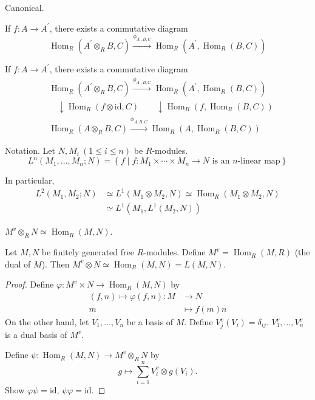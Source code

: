 \documentclass[11pt, a4paper]{report}
\begin{document}
\begin{remark}
Canonical.

If $f: A \rightarrow A^{\prime}$, there exists a commutative diagram
\[
\operatorname{Hom}_{R}\left(A^{\prime} \otimes_{R} B, C\right) \xrightarrow{\phi_{A^{\prime}, B, C}} \operatorname{Hom}_{R}\left(A^{\prime}, \operatorname{Hom}_{R}(B, C)\right)
\]

If $f: A \rightarrow A^{\prime}$, there exists a commutative diagram
\[
\begin{aligned}
& \operatorname{Hom}_{R}\left(A^{\prime} \otimes_{R} B, C\right) \xrightarrow{\phi_{A^{\prime}, B, C}} \operatorname{Hom}_{R}\left(A^{\prime}, \operatorname{Hom}_{R}(B, C)\right) \\
& \quad \downarrow{\operatorname{Hom}_{R}(f \otimes \mathrm{id}, C)} \quad \quad \downarrow{\operatorname{Hom}_{R}(f, \operatorname{Hom}_{R}(B, C))} \\
& \operatorname{Hom}_{R}\left(A \otimes_{R} B, C\right) \xrightarrow{\phi_{A, B, C}} \operatorname{Hom}_{R}\left(A, \operatorname{Hom}_{R}(B, C)\right)
\end{aligned}
\]

Notation. Let $N, M_{i}\ (1 \leq i \leq n)$ be $R$-modules.
\[
L^{n}\left(M_{1}, \ldots, M_{n}; N\right) = \left\{f \mid f: M_{1} \times \cdots \times M_{n} \rightarrow N \text{ is an } n\text{-linear map}\right\}
\]

In particular,
\[
\begin{aligned}
L^{2}\left(M_{1}, M_{2}; N\right) & \simeq L^{1}\left(M_{1} \otimes M_{2}, N\right) \simeq \operatorname{Hom}_{R}\left(M_{1} \otimes M_{2}, N\right) \\
& \simeq L^{1}\left(M_{1}, L^{1}\left(M_{2}, N\right)\right)
\end{aligned}
\]
\end{remark}

\begin{proposition}
$M^{v} \otimes_{R} N \simeq \operatorname{Hom}_{R}(M, N)$.

Let $M, N$ be finitely generated free $R$-modules. Define $M^{v} = \operatorname{Hom}_{R}(M, R)$ (the dual of $M$). Then $M^{v} \otimes N \simeq \operatorname{Hom}_{R}(M, N) = L(M, N)$.
\end{proposition}

\begin{proof}
Define $\varphi: M^{v} \times N \rightarrow \operatorname{Hom}_{R}(M, N)$ by
\[
\begin{aligned}
(f, n) \mapsto \varphi(f, n): M & \rightarrow N \\
m & \mapsto f(m) n
\end{aligned}
\]
On the other hand, let $V_{1}, \dots, V_{n}$ be a basis of $M$. Define $V_{j}^{v}(V_{i}) = \delta_{ij}$. $V_{1}^{v}, \dots, V_{n}^{v}$ is a dual basis of $M^{v}$.

Define $\psi\colon \operatorname{Hom}_{R}(M, N) \rightarrow M^{v} \otimes_{R} N$ by
\[
g \mapsto \sum_{i=1}^{n} V_{i}^{v} \otimes g(V_{i}).
\]
Show $\varphi \psi = \mathrm{id}$, $\psi \varphi = \mathrm{id}$.
\end{proof}
\end{document}
